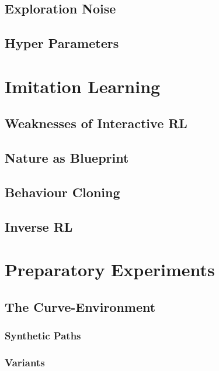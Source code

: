     \subsection{Exploration Noise}
    
    \subsection{Hyper Parameters}
    
    
\newpage
\section{Imitation Learning}
    
        \subsection{Weaknesses of Interactive RL}
         \label{subchap:weak}
        \subsection{Nature as Blueprint}
        
        \subsection{Behaviour Cloning}
        
        \subsection{Inverse RL}
        
\newpage
\section{Preparatory Experiments}

    \subsection{The Curve-Environment}
        
        \subsubsection{Synthetic Paths}
        
        \subsubsection{Variants}
        

